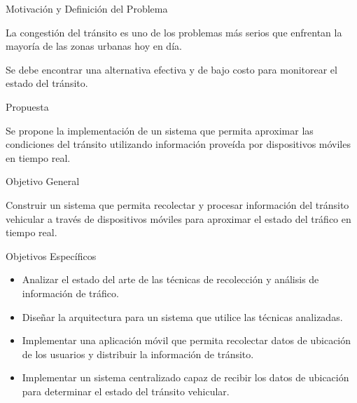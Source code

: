 
\begin{frame}[c]{Motivación y Definición del Problema}
	\begin{center}
	La congestión del tránsito es uno de los problemas más serios que enfrentan la mayoría de las zonas urbanas hoy en día. 
	
	\vspace{\baselineskip}
	\vspace{\baselineskip}
	Se debe encontrar una alternativa efectiva y de bajo costo para monitorear el estado del tránsito.
    \end{center}
\end{frame}

\begin{frame}[c]{Propuesta}
    \begin{center}
    Se propone la implementación de un sistema que permita aproximar las condiciones del tránsito utilizando información proveída por dispositivos móviles en tiempo real.
    \end{center}
\end{frame}

\begin{frame}[c]{Objetivo General}
    \begin{center}
    Construir un sistema que permita recolectar
    y procesar información del tránsito vehicular a través de dispositivos móviles para aproximar el estado del tráfico en tiempo real.
    \end{center}
\end{frame}

\begin{frame}[c]{Objetivos Específicos}
    \begin{center}
        \begin{itemize}
        \item Analizar el estado del arte de las técnicas de recolección y análisis de información de tráfico.
        \item Diseñar la arquitectura para un sistema que utilice las técnicas analizadas.
        \item Implementar una aplicación móvil que permita recolectar datos de ubicación de los usuarios y distribuir la información de tránsito.
        \item Implementar un sistema centralizado capaz de recibir los datos de ubicación para determinar el estado del tránsito vehicular.
        \end{itemize}
    \end{center}
\end{frame}

